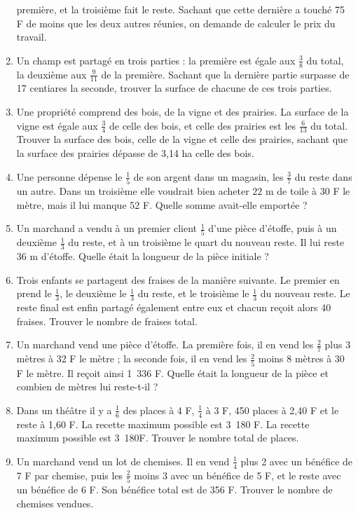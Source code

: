 \begin{enumerate}
 première, et la troisième fait le reste. Sachant que cette dernière a touché 75 F de moins que les deux autres réunies, on demande de calculer le prix du travail.
 \item Un champ est partagé en trois parties : la première est égale aux $\frac38$ du total, la deuxième aux $\frac9{11}$ de la première. Sachant que la dernière partie surpasse de 17 centiares la seconde, trouver la surface de chacune de ces trois parties.
 \item Une propriété comprend des bois, de la vigne et des prairies. La surface de la vigne est égale aux $\frac34$ de celle des bois, et celle des prairies est les $\frac6{13}$ du total. Trouver la surface des bois, celle de la vigne et celle des prairies, sachant que la surface des prairies dépasse de 3,14 ha celle des bois. 
 \item Une personne dépense le $\frac15$ de son argent dans un magasin, les $\frac37$ du reste dans un autre. Dans un troisième elle voudrait bien acheter $22$ m de toile à 30 F le mètre, mais il lui manque 52 F. Quelle somme avait-elle emportée ?
 \item Un marchand a vendu à un premier client $\frac15$ d'une pièce d'étoffe, puis à un deuxième $\frac13$ du reste, et à un troisième le quart du nouveau reste. Il lui reste 36 m d'étoffe. Quelle était la longueur de la pièce initiale ? 
 \item Trois enfants se partagent des fraises de la manière suivante. Le premier en prend le $\frac13$, le deuxième le $\frac13$ du reste, et le troisième le $\frac13$ du nouveau reste. Le reste final est enfin partagé également entre eux et chacun reçoit alors 40 fraises. Trouver le nombre de fraises total. 
 \item Un marchand vend une pièce d'étoffe. La première fois, il en vend les $\frac27$ plus 3 mètres à 32 F le mètre ; la seconde fois, il en vend les $\frac25$ moins 8 mètres à 30 F le mètre. Il reçoit ainsi 1~336 F. Quelle était la longueur de la pièce et combien de 
 mètres lui reste-t-il ? 
 \item Dans un théâtre il y a $\frac16$ des places à 4 F, $\frac14$ à 3 F, 450 places à 2,40 F et le reste à 1,60 F. La recette maximum
 possible est 3~180 F. La recette maximum possible est 3~180F. Trouver le nombre total de places. 
 \item Un marchand vend un lot de chemises. Il en vend $\frac14$ plus 2 avec un bénéfice de 7 F par chemise, puis les $\frac25$ moins 3 avec un bénéfice de 5 F, et le reste avec un bénéfice de 6 F. Son bénéfice total est de 356 F. Trouver le nombre de chemises vendues. 

\end{enumerate}
